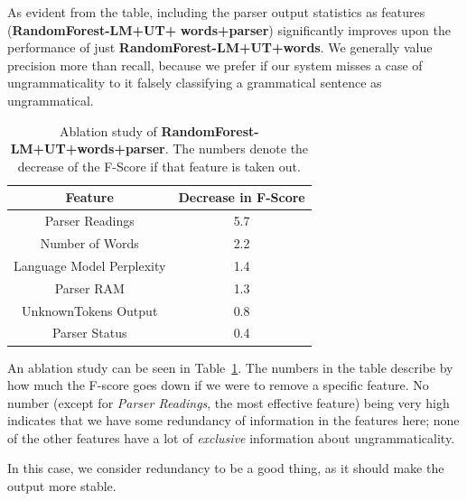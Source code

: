 \documentclass[a4paper,10pt]{scrartcl}
\theoremstyle{style}
\begin{document}
As evident from the table, including the parser output statistics as features (\textbf{RandomForest-LM+UT+} \textbf{words+parser}) significantly improves upon the performance of just \textbf{RandomForest-LM+UT+words}. We generally value precision more than recall, because we prefer if our system misses a case of ungrammaticality to it falsely classifying a grammatical sentence as ungrammatical.

\begin{table}
\begin{center}
\begin{tabular}{c|c}
  \hline\hline
  Feature & Decrease in F-Score\\%
  \hline
  Parser Readings & 5.7\\%
  Number of Words & 2.2\\%
  Language Model Perplexity & 1.4\\%
  Parser RAM & 1.3\\%
  UnknownTokens Output & 0.8\\%
  Parser Status & 0.4\\%
  \hline\hline
  \end{tabular}
  \end{center}

  \caption{Ablation study of \textbf{RandomForest-LM+UT+words+parser}. The numbers denote the decrease of the F-Score if that feature is taken out.}
  \label{ablation_study_randomforest}
 \end{table}

An ablation study can be seen in Table~\ref{ablation_study_randomforest}.
The numbers in the table describe by how much the F-score goes down if we were to remove a specific feature.
No number (except for \textit{Parser Readings}, the most effective feature) being very high indicates that we have some redundancy of information in the features here; none of the other features have a lot of \textit{exclusive} information about ungrammaticality.

In this case, we consider redundancy to be a good thing, as it should make the output more stable.

\end{document}
